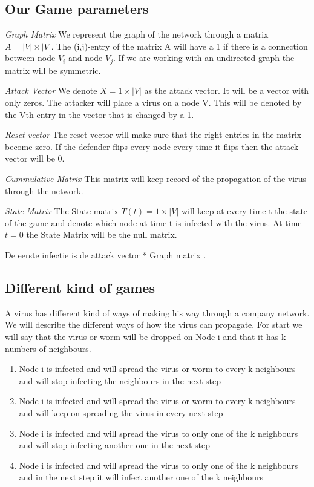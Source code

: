 \begin{description}
\subsection{Our Game parameters}
\begin{description}
\item \textit{Graph Matrix} We represent the graph of the network through a matrix $ A = |V| \times |V|$. The (i,j)-entry of the matrix A will have a 1 if there is a connection between node $V_{i}$ and node $V_{j}$. If we are working with an undirected graph the matrix will be symmetric. 
\item \textit{Attack Vector} We denote $X = 1 \times |V|$ as the attack vector. It will be a vector with only zeros. The attacker will place a virus on a node V. This will be denoted by the Vth entry in the vector that is changed by a 1.
\item \textit{Reset vector} The reset vector will make sure that the right entries in the matrix become zero. If the defender flips every node every time it flips then the attack vector will be 0.
\item \textit{Cummulative Matrix} This matrix will keep record of the propagation of the virus through the network.
\item \textit{State Matrix} The State matrix $T(t) = 1 \times |V| $ will keep at every time t the state of the game and denote which node at time t is infected with the virus. At time $t=0$ the State Matrix will be the null matrix.
\end{description}
De eerste infectie is de attack vector * Graph matrix . 
\end{description}

\subsection{Different kind of games}
A virus has different kind of ways of making his way through a company network. We will describe the different ways of how the virus can propagate. For start we will say that the virus or worm will be dropped on Node i and that it has k numbers of neighbours. 
\begin{enumerate}
\item Node i is infected and will spread the virus or worm to every k neighbours and will stop infecting the neighbours in the next step
\item Node i is infected and will spread the virus or worm to every k neighbours and will keep on spreading the virus in every next step
\item Node i is infected and will spread the virus to only one of the k neighbours and will stop infecting another one in the next step
\item Node i is infected and will spread the virus to only one of the k neighbours and in the next step it will infect another one of the k neighbours 
\end{enumerate}

